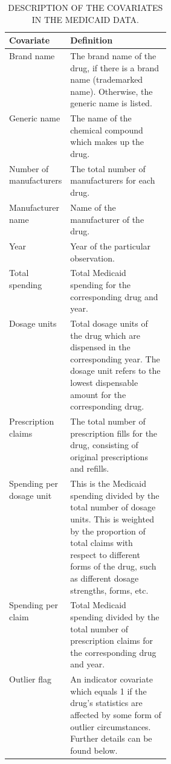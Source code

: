 \documentclass[12pt]{article}
\begin{document}
\begin{table}[H]
\centering
\caption{\MakeUppercase{Description of the covariates in the Medicaid data.}}
\label{table:table6}
\begin{singlespace}
\begin{minipage}{0.95\linewidth}
\small
\begin{tabularx}{\linewidth}{@{}>{\raggedright\arraybackslash}p{0.31\linewidth}X@{}}

\toprule
Covariate & Definition \tabularnewline
\midrule

Brand name & The brand name of the drug, if there is a brand name (trademarked name). Otherwise, the generic name is listed. \tabularnewline \addlinespace[3pt]

Generic name & The name of the chemical compound which makes up the drug. \tabularnewline \addlinespace[3pt]

Number of manufacturers & The total number of manufacturers for each drug. \tabularnewline \addlinespace[3pt]

Manufacturer name & Name of the manufacturer of the drug. \tabularnewline \addlinespace[3pt]

Year & Year of the particular observation. \tabularnewline \addlinespace[3pt]

Total spending & Total Medicaid spending for the corresponding drug and year. \tabularnewline \addlinespace[3pt]

Dosage units & Total dosage units of the drug which are dispensed in the corresponding year. The dosage unit refers to the lowest dispensable amount for the corresponding drug. \tabularnewline \addlinespace[3pt]

Prescription claims & The total number of prescription fills for the drug, consisting of original prescriptions and refills. \tabularnewline \addlinespace[3pt]

Spending per dosage unit & This is the Medicaid spending divided by the total number of dosage units. This is weighted by the proportion of total claims with respect to different forms of the drug, such as different dosage strengths, forms, etc.\tabularnewline \addlinespace[3pt]

Spending per claim & Total Medicaid spending divided by the total number of prescription claims for the corresponding drug and year. \tabularnewline \addlinespace[3pt]

Outlier flag & An indicator covariate which equals 1 if the drug's statistics are affected by some form of outlier circumstances. Further details can be found below. \tabularnewline

\bottomrule
\end{tabularx}
\end{minipage}
\end{singlespace}
\end{table}
\end{document}
